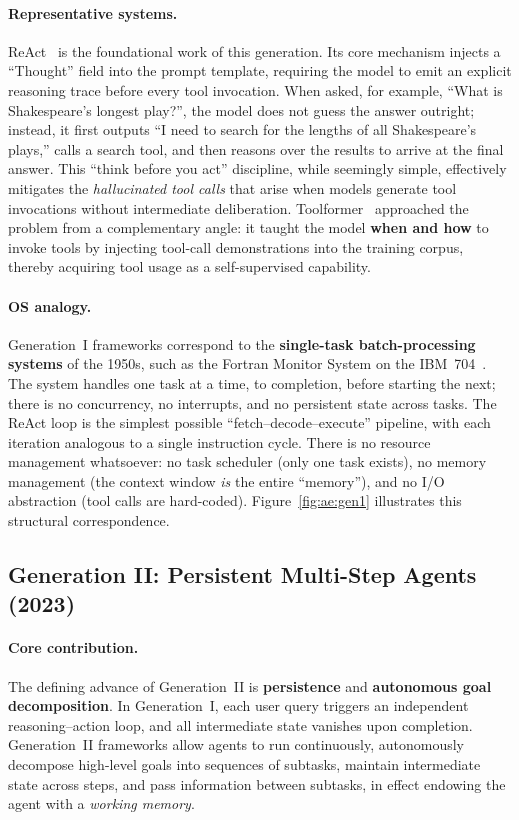 \paragraph{Representative systems.}
ReAct~\cite{yao2023react} is the foundational work of this generation.
Its core mechanism injects a ``Thought'' field into the prompt template, requiring the model to emit an explicit reasoning trace before every tool invocation.
When asked, for example, ``What is Shakespeare's longest play?'', the model does not guess the answer outright; instead, it first outputs ``I need to search for the lengths of all Shakespeare's plays,'' calls a search tool, and then reasons over the results to arrive at the final answer.
This ``think before you act'' discipline, while seemingly simple, effectively mitigates the \textit{hallucinated tool calls} that arise when models generate tool invocations without intermediate deliberation.
Toolformer~\cite{schick2023toolformer} approached the problem from a complementary angle: it taught the model \textbf{when and how} to invoke tools by injecting tool-call demonstrations into the training corpus, thereby acquiring tool usage as a self-supervised capability.

\paragraph{OS analogy.}
Generation~I frameworks correspond to the \textbf{single-task batch-processing systems} of the 1950s, such as the Fortran Monitor System on the IBM~704~\cite{ostep_2023}.
The system handles one task at a time, to completion, before starting the next; there is no concurrency, no interrupts, and no persistent state across tasks.
The ReAct loop is the simplest possible ``fetch--decode--execute'' pipeline, with each iteration analogous to a single instruction cycle.
There is no resource management whatsoever: no task scheduler (only one task exists), no memory management (the context window \textit{is} the entire ``memory''), and no I/O abstraction (tool calls are hard-coded).
Figure~\ref{fig:ae:gen1} illustrates this structural correspondence.


\subsection{Generation II: Persistent Multi-Step Agents (2023)}

\paragraph{Core contribution.}
The defining advance of Generation~II is \textbf{persistence} and \textbf{autonomous goal decomposition}.
In Generation~I, each user query triggers an independent reasoning--action loop, and all intermediate state vanishes upon completion.
Generation~II frameworks allow agents to run continuously, autonomously decompose high-level goals into sequences of subtasks, maintain intermediate state across steps, and pass information between subtasks, in effect endowing the agent with a \textit{working memory}.


